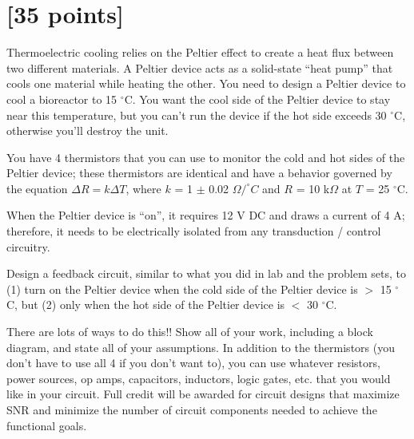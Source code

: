 \documentclass[12pt]{article}
\begin{document}
\clearpage



\section{[35 points]}

Thermoelectric cooling relies on the Peltier effect to create a heat flux
between two different materials.  A Peltier device acts as a solid-state ``heat
pump'' that cools one material while heating the other.  You need to design a
Peltier device to cool a bioreactor to 15 $^\circ$C.  You want the cool side of
the Peltier device to stay near this temperature, but you can't run the device
if the hot side exceeds 30 $^\circ$C, otherwise you'll destroy the unit.  

You have 4 thermistors that you can use to monitor the cold and hot sides of
the Peltier device; these thermistors are identical and have a behavior
governed by the equation $\Delta R = k \Delta T$, where $k$ = 1 $\pm$ 0.02
$\Omega/^\circ C$ and $R$ = 10 k$\Omega$ at $T$ = 25 $^\circ$C.

When the Peltier device is ``on'', it requires 12 V DC and draws a current of 4
A; therefore, it needs to be electrically isolated from any transduction /
control circuitry.

Design a feedback circuit, similar to what you did in lab and the problem sets,
to (1) turn on the Peltier device when the cold side of the Peltier device is
$>$ 15 $^\circ$C, but (2) only when the hot side of the Peltier device is $<$
30 $^\circ$C.

There are lots of ways to do this!!  Show all of your work, including a block
diagram, and state all of your assumptions.  In addition to the thermistors
(you don't have to use all 4 if you don't want to), you can use whatever
resistors, power sources, op amps, capacitors, inductors, logic gates, etc.
that you would like in your circuit.  Full credit will be awarded for circuit
designs that maximize SNR and minimize the number of circuit components needed
to achieve the functional goals.

\clearpage



\clearpage


\end{document}
